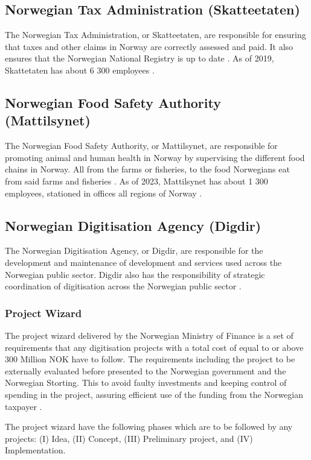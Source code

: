 \subsection{Norwegian Tax Administration (Skatteetaten)}
The Norwegian Tax Administration, or Skatteetaten, are responsible for ensuring that taxes and other claims in Norway are correctly assessed and paid. It also ensures that the Norwegian National Registry is up to date \cite{skatt_r_2023}. As of 2019, Skattetaten has about 6 300 employees \cite{skatt_r_2023}. 

\subsection{Norwegian Food Safety Authority (Mattilsynet)}
The Norwegian Food Safety Authority, or Mattilsynet, are responsible for promoting animal and human health in Norway by supervising the different food chains in Norway. All from the farms or fisheries, to the food Norwegians eat from said farms and fisheries \cite{mat_r_2023}. As of 2023, Mattilsynet has about 1 300 employees, stationed in offices all regions of Norway \cite{org_mat_2023}.

\subsection{Norwegian Digitisation Agency (Digdir)}
The Norwegian Digitisation Agency, or Digdir, are responsible for the development and maintenance of development and services used across the Norwegian public sector. Digdir also has the responsibility of strategic coordination of digitisation across the Norwegian public sector \cite{digdir_r_2023}.

\subsubsection{Project Wizard}
The project wizard delivered by the Norwegian Ministry of Finance is a set of requirements that any digitisation projects with a total cost of equal to or above 300 Million NOK have to follow. The requirements including the project to be externally evaluated before presented to the Norwegian government and the Norwegian Storting. This to avoid faulty investments and keeping control of spending in the project, assuring efficient use of the funding from the Norwegian taxpayer \cite{project_wizard_r_2019}.

The project wizard have the following phases which are to be followed by any projects: (I) Idea, (II) Concept, (III) Preliminary project, and (IV) Implementation.

